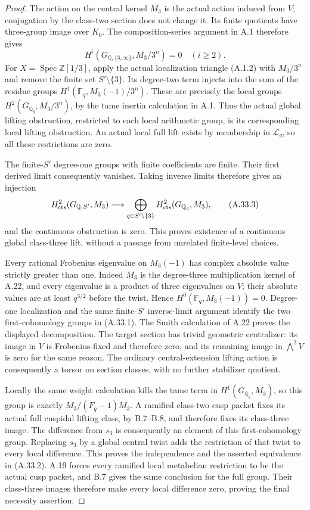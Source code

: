 \begin{proof}
The action on the central kernel $M_3$ is the actual action
induced from $V$; conjugation by the class-two section does not
change it. Its finite quotients have three-group image over
$K_0$. The composition-series argument in A.1 therefore gives
\[
 H^i(G_{\mathbb Q,\{3,\infty\}},M_3/3^n)=0
 \quad(i\ge2).
\]
For $X=\operatorname{Spec}\mathbb Z[1/3]$, apply the actual
localization triangle (A.1.2) with $M_3/3^n$ and remove the
finite set $S'\setminus\{3\}$. Its degree-two term injects
into the sum of the residue groups
$H^1(\mathbb F_q,M_3(-1)/3^n)$. These are precisely the
local groups $H^2(G_{\mathbb Q_q},M_3/3^n)$, by the tame
inertia calculation in A.1. Thus the actual global lifting
obstruction, restricted to each local arithmetic group, is its
corresponding local lifting obstruction. An actual local full
lift exists by membership in $\mathscr L_q$, so all these
restrictions are zero.

The finite-$S'$ degree-one groups with finite coefficients are
finite. Their first derived limit consequently vanishes.
Taking inverse limits therefore gives an injection
\[
 H^2_{\rm cts}(G_{\mathbb Q,S'},M_3)
 \longrightarrow\bigoplus_{q\in S'\setminus\{3\}}
       H^2_{\rm cts}(G_{\mathbb Q_q},M_3),
 \tag{A.33.3}
\]
and the continuous obstruction is zero. This proves existence
of a continuous global class-three lift, without a passage
from unrelated finite-level choices.

Every rational Frobenius eigenvalue on $M_3(-1)$ has complex
absolute value strictly greater than one. Indeed $M_3$ is
the degree-three multiplication kernel of A.22, and every
eigenvalue is a product of three eigenvalues on $V$; their
absolute values are at least $q^{3/2}$ before the twist.
Hence $H^0(\mathbb F_q,M_3(-1))=0$. Degree-one localization
and the same finite-$S'$ inverse-limit argument identify
the two first-cohomology groups in (A.33.1). The Smith
calculation of A.22 proves the displayed decomposition.
The target section has trivial geometric centralizer: its
image in $V$ is Frobenius-fixed and therefore zero, and
its remaining image in $\bigwedge^2V$ is zero for the
same reason. The ordinary central-extension lifting action
is consequently a torsor on section classes, with no further
stabilizer quotient.

Locally the same weight calculation kills the tame term in
$H^1(G_{\mathbb Q_q},M_3)$, so this group is exactly
$M_3/(F_q-1)M_3$. A ramified class-two cusp packet fixes
its actual full cuspidal lifting class, by B.7--B.8, and
therefore fixes its class-three image. The difference from
$s_3$ is consequently an element of this first-cohomology
group. Replacing $s_3$ by a global central twist adds the
restriction of that twist to every local difference. This
proves the independence and the asserted equivalence in
(A.33.2). A.19 forces every ramified local metabelian
restriction to be the actual cusp packet, and B.7 gives
the same conclusion for the full group. Their class-three
images therefore make every local difference zero, proving
the final necessity assertion.
\end{proof}

